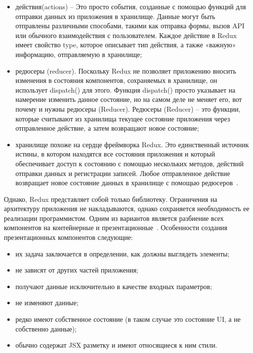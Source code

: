 \begin{itemize}
  \item действия(actions) -- Это просто события, созданные с помощью функций для отправки данных из приложения в
  хранилище. Данные могут быть отправлены различными способами, такими как отправка формы, вызов API или обычного
  взаимодействия с пользователем. Каждое действие в Redux имеет свойство type, которое описывает тип действия, а также
  «важную» информацию, отправляемую в хранилище;
  \item редюсеры (reducer). Поскольку Redux не позволяет приложению вносить изменения в состояния компонентов,
  сохраняемых в хранилище, он использует dispatch() для этого. Функция dispatch() просто указывает на намерение изменить
  данное состояние, но на самом деле не меняет его, вот почему и нужны редюсеры (Reducer).
  Редюсеры (Reducer) – это функции, которые считывают из хранилища текущее состояние приложения через отправленное
  действие, а затем возвращают новое состояние;
  \item хранилище похоже на сердце фреймворка Redux. Это единственный источник истины, в котором находятся все состояния
  приложения и который обеспечивает доступ к состоянию с помощью нескольких методов, действий отправки данных и
  регистрации записей. Любое отправленное действие возвращает новое состояние  данных в хранилище с помощью
  редюсеров~\cite{redux}.
\end{itemize}

Однако, Redux представляет собой только библиотеку. Ограничения на архитектуру приложения не накладываются, однако
сохраняется необходимость ее реализации программистом. Одним из вариантов является разбиение всех компонентов на
контейнерные и презентационные~\cite{presentational_and_container_components}. Особенности создания презентационных
компонентов следующие:

\begin{itemize}
	\item их задача заключается в определении, как должны выглядеть элементы;
	\item не зависят от других частей приложения;
	\item получают данные исключительно в качестве входных параметров;
	\item не изменяют данные;
	\item редко имеют собственное состояние (в таком случае это состояние UI, а не собственно данные);
	\item обычно содержат JSX разметку и имеют относящиеся к ним стили.
\end{itemize}

